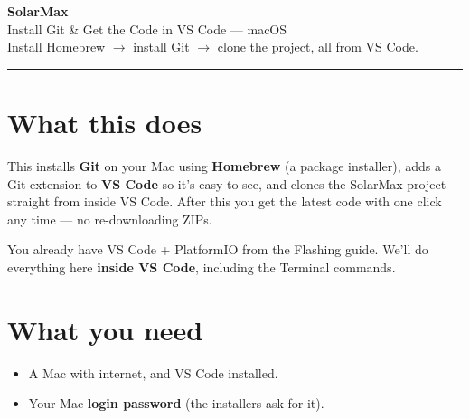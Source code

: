 \documentclass[11pt]{article}
\begin{document}
\begin{center}
{\Huge\bfseries\color{brandblue} SolarMax}\\[4pt]
{\LARGE Install Git \& Get the Code in VS Code --- macOS}\\[8pt]
{\large Install Homebrew \(\rightarrow\) install Git \(\rightarrow\) clone the project, all from VS Code.}\\[6pt]
\rule{0.9\linewidth}{0.8pt}
\end{center}

\vspace{4pt}
\tableofcontents
\vspace{8pt}

\section{What this does}
This installs \textbf{Git} on your Mac using \textbf{Homebrew} (a package installer),
adds a Git extension to \textbf{VS Code} so it's easy to see, and clones the SolarMax
project straight from inside VS Code. After this you get the latest code with one
click any time --- no re-downloading ZIPs.

\begin{note}
You already have VS Code + PlatformIO from the Flashing guide. We'll do everything
here \textbf{inside VS Code}, including the Terminal commands.
\end{note}

\section{What you need}
\begin{itemize}[leftmargin=1.6em]
  \item A Mac with internet, and VS Code installed.
  \item Your Mac \textbf{login password} (the installers ask for it).
\end{itemize}

\end{document}
